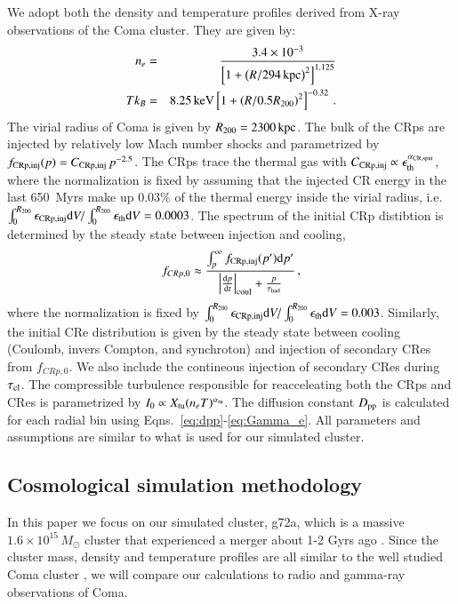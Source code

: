 \documentclass[a4paper,fleqn,usenatbib]{mnras}
\begin{document}
We adopt both the density \cite{1992A&A...259L..31B} and temperature
\cite{2009ApJ...696.1886B,2001A&A...365L..67A} profiles derived from
X-ray observations of the Coma cluster. They are given by:
\begin{eqnarray}
n_e &=& \frac{3.4\times10^{-3}}{\left[1+\left(R/294\,{\mathrm{kpc}}\right)^2\right]^{1.125}}\nonumber\\
T k_B &=& 8.25\,{\mathrm{keV}} \left[1+\left(R/0.5R_{200}\right)^2\right]^{-0.32}\,.
\end{eqnarray}
The virial radius of Coma is given by $R_{200} = 2300\,{\mathrm{kpc}}$.
The bulk of the CRps are injected by relatively low Mach number shocks
and parametrized by $f_{\mathrm{CRp,inj}}(p) =
C_{\mathrm{CRp,inj}}\,p^{-2.5}$. The CRps trace the thermal gas with
$C_{\mathrm{CRp,inj}} \propto \epsilon_{\mathrm{th}}^{\alpha_{\mathrm{CR,spat}}}$,
where the normalization is fixed by assuming that the injected CR
energy in the last 650~Myrs make up 0.03\% of the thermal energy
inside the virial radius, i.e.
$\int_0^{R_{200}}\epsilon_{\mathrm{CRp,inj}} {\mathrm{d}}
V/\int_0^{R_{200}}\epsilon_{\mathrm{th}} {\mathrm{d}}V = 0.0003$. The spectrum of
  the initial CRp distibtion is determined by the steady state between
  injection and cooling,
\begin{equation}
 f_{CRp,0} \approx \frac{\int_p^\infty f_{\mathrm{CRp,inj}}(p') 
{\mathrm{d}}p'}{\left|{{{\mathrm{d}}p}\over{{\mathrm{d}}t}}\right|_{\rm coul}+\frac{p}{\tau_{\rm had}}}\,,
\end{equation}
where the normalization is fixed by
$\int_0^{R_{200}}\epsilon_{\mathrm{CRp,inj}}
{\mathrm{d}}V/\int_0^{R_{200}}\epsilon_{\mathrm{th}} {\mathrm{d}}V =
0.003$. Similarly, the initial CRe distribution is given by the steady
state between cooling (Coulomb, invers Compton, and synchroton) and
injection of secondary CRes from $f_{CRp,0}$. We also include the
contineous injection of secondary CRes during $\tau_{\mathrm{cl}}$. The
compressible turbulence responsible for reacceleating both the CRps
and CRes is parametrized by $I_0 \propto X_{\mathrm{tu}} (n_e
T)^{\alpha_{\mathrm{tu}}}$. The diffusion constant $D_{\mathrm{pp}}$ is
calculated for each radial bin using
Eqns.~\ref{eq:dpp}-\ref{eq:Gamma_e}. All parameters and assumptions
are similar to what is used for our simulated cluster.

\subsection{Cosmological simulation methodology}
In this paper we focus on our simulated cluster, g72a, which is a
massive $1.6\times10^{15}\,M_\odot$ cluster that experienced a merger
about 1-2 Gyrs ago \citep{2009MNRAS.399..497D}. Since the cluster
mass, density and temperature profiles are all similar to the well
studied Coma cluster \citep{2007MNRAS.378..385P,pinzke10}, we will
compare our calculations to radio and gamma-ray observations of Coma.
\end{document}
